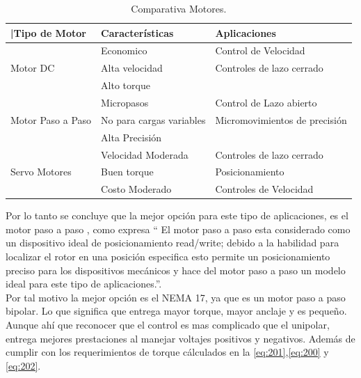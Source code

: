 \begin{table}[H]
\begin{center}
\begin{tabular}{ p{3.5cm} p{4cm} p{5cm} }
\toprule[0.6mm]
|Tipo de Motor & Características & Aplicaciones \\
\midrule
\multirow{3}{2cm}{Motor DC} & Economico & Control de Velocidad  \\ 
\cmidrule{2-3}
& Alta velocidad & Controles de lazo cerrado  \\ 
\cmidrule{2-3}
& Alto torque &  \\ 
\midrule
\multirow{3}{2cm}{Motor Paso a Paso} & Micropasos & Control de Lazo abierto \\ 
\cmidrule{2-3}
& No para cargas variables & Micromovimientos de precisión  \\ 
\cmidrule{2-3}
& Alta Precisión &  \\ 
\midrule
\multirow{3}{2cm}{Servo Motores} & Velocidad Moderada & Controles de lazo cerrado \\ 
\cmidrule{2-3}
& Buen torque & Posicionamiento  \\ 
\cmidrule{2-3}
& Costo Moderado & Controles de Velocidad \\ 
\bottomrule[0.6mm]
\end{tabular}
\caption{Comparativa Motores.}
\label{tabla:motores}
\end{center}
\end{table}





Por lo tanto se concluye que la mejor opción para este tipo de aplicaciones, es el motor paso a paso , como \citep{18} expresa “ El motor paso a paso esta considerado como un dispositivo ideal de posicionamiento read/write; debido a la habilidad para localizar el rotor en una posición especifica esto permite un posicionamiento preciso para los dispositivos mecánicos y hace del motor paso a paso un modelo ideal para este tipo de aplicaciones.''.\\

Por tal motivo la mejor opción es el NEMA 17, ya que es un motor paso a paso bipolar. Lo que significa que entrega mayor torque, mayor anclaje y es pequeño. Aunque ahí que reconocer que el control es mas complicado que el unipolar, entrega mejores prestaciones al manejar voltajes positivos y negativos. Además de cumplir con los requerimientos de torque cálculados en la \autoref{eq:201},\autoref{eq:200} y \autoref{eq:202}.\\


